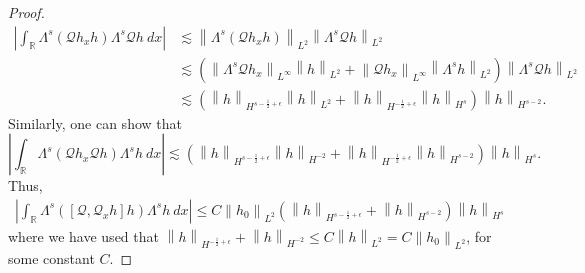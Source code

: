 \documentclass[final,11pt,a4paper,reqno]{amsart}
\newcommand{\norm}[1]{\left\| #1 \right\|}
\newcommand{\av}[1]{\left| #1 \right|}
\newcommand{\RR}{\mathbb R}
\theoremstyle{definition}
\begin{document}
\begin{proof}
\begin{align*}
 \av{\int_{\RR} \Lambda^{s}(\mathscr{Q}h_{x}h)\Lambda^{s}\mathscr{Q}h \ dx} &\lesssim \norm{\Lambda^{s}(\mathscr{Q}h_{x}h)}_{L^{2}}\norm{\Lambda^{s}\mathscr{Q}h}_{L^{2}} \\
&\lesssim \left( \norm{\Lambda^{s}\mathscr{Q}h_{x}}_{L^{\infty}}\norm{h}_{L^{2}}+\norm{\mathscr{Q}h_{x}}_{L^{\infty}}\norm{\Lambda^{s}h}_{L^{2}} \right)\norm{\Lambda^{s}\mathscr{Q}h}_{L^{2}}
 \\
&\lesssim \left( \norm{h}_{H^{s-\frac{1}{2}+\epsilon}}\norm{h}_{L^{2}}+\norm{h}_{H^{-\frac{1}{2}+\epsilon}}\norm{h}_{H^{s}}\right) \norm{h}_{H^{s-2}}.
\end{align*}
Similarly, one can show that
\[ \av{\int_{\RR} \Lambda^{s}(\mathscr{Q}h_{x}\mathscr{Q}h)\Lambda^{s}h \ dx} \lesssim \left( \norm{h}_{H^{s-\frac{1}{2}+\epsilon}}\norm{h}_{H^{-2}}+\norm{h}_{H^{-\frac{1}{2}+\epsilon}}\norm{h}_{H^{s-2}}\right) \norm{h}_{H^{s}}.
\]
Thus, 
\begin{align}\label{Hs:est:2}
\av{\int_{\RR}\Lambda^{s}\left([\mathscr{Q},\mathscr{Q}_{x}h]h\right)\Lambda^{s}h \ dx} \leq C\norm{h_{0}}_{L^{2}} \left(\norm{h}_{H^{s-\frac{1}{2}+\epsilon}}+\norm{h}_{H^{s-2}}\right) \norm{h}_{H^{s}}
\end{align} 
where we have used that $\norm{h}_{H^{-\frac{1}{2}+\epsilon}}+\norm{h}_{H^{-2}}\leq C \norm{h}_{L^{2}}=C\norm{h_0}_{L^{2}}$, for some constant $C$.


\end{proof}
\end{document}
